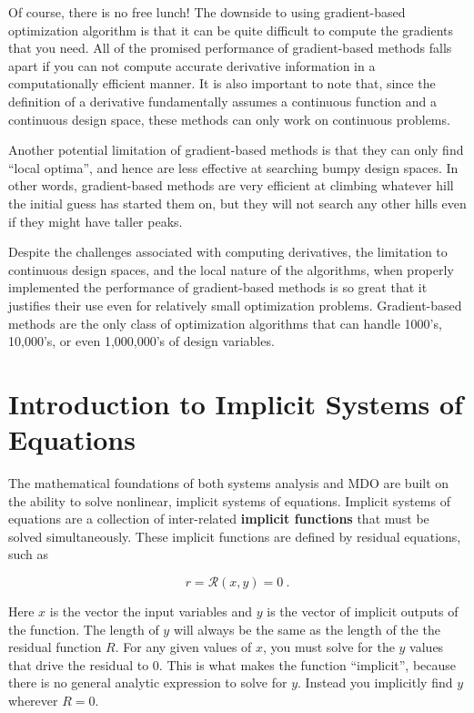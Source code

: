 \documentclass[conf]{new-aiaa}
\begin{document}
            Of course, there is no free lunch! The downside to using gradient-based optimization algorithm is that it can be quite difficult to compute the gradients that you need. 
            All of the promised performance of gradient-based methods falls apart if you can not compute accurate derivative information in a computationally efficient manner. 
            It is also important to note that, since the definition of a derivative fundamentally assumes a continuous function and a continuous design space, these methods can only work on continuous problems. 

            Another potential limitation of gradient-based methods is that they can only find ``local optima'', and hence are less effective at searching bumpy design spaces. 
            In other words, gradient-based methods are very efficient at climbing whatever hill the initial guess has started them on, but they will not search any other hills even if they might have taller peaks. 

            Despite the challenges associated with computing derivatives, the limitation to continuous design spaces, and the local nature of the algorithms, when properly implemented the performance of gradient-based methods is so great that it justifies their use even for relatively small optimization problems. 
            Gradient-based methods are the only class of optimization algorithms that can handle 1000's, 10,000's, or even 1,000,000's of design variables. 


\section{Introduction to Implicit Systems of Equations}

The mathematical foundations of both systems analysis and MDO are built on the ability to solve nonlinear, implicit systems of equations. 
Implicit systems of equations are a collection of inter-related \textbf{implicit functions} that must be solved simultaneously. 
These implicit functions are defined by residual equations, such as 

    \begin{equation} 
    r = \mathcal{R}(x, y) = 0 \ . 
    \label{equation}
    \end{equation}

Here $x$ is the vector the input variables and $y$ is the vector of implicit outputs of the function. 
The length of $y$ will always be the same as the length of the the residual function $R$.
For any given values of $x$, you must solve for the $y$ values that drive the residual to 0. 
This is what makes the function ``implicit'', because there is no general analytic expression to solve for $y$. 
Instead you implicitly find $y$ wherever $R=0$. 
\end{document}
